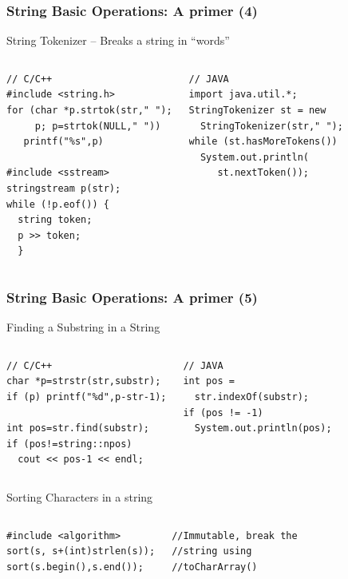 \documentclass{beamer}
\begin{document}
\begin{frame}[fragile]
  \frametitle{String Basic Operations: A primer (4)}
  {\smaller
    \begin{block}{String Tokenizer -- Breaks a string in ``words''}
      \begin{columns}[T]
\begin{verbatim}
// C/C++
#include <string.h>
for (char *p.strtok(str," ");
     p; p=strtok(NULL," "))
   printf("%s",p)

#include <sstream>
stringstream p(str);
while (!p.eof()) {
  string token;
  p >> token;
  }
\end{verbatim}
\begin{verbatim}
// JAVA
import java.util.*;
StringTokenizer st = new
  StringTokenizer(str," ");
while (st.hasMoreTokens())
  System.out.println(
     st.nextToken());
\end{verbatim}
      \end{columns}
    \end{block}
    }
\end{frame}

\begin{frame}[fragile]
  \frametitle{String Basic Operations: A primer (5)}
  {\smaller
    \begin{block}{Finding a Substring in a String}
      \begin{columns}[T]
\begin{verbatim}
// C/C++
char *p=strstr(str,substr);
if (p) printf("%d",p-str-1);

int pos=str.find(substr);
if (pos!=string::npos)
  cout << pos-1 << endl;
\end{verbatim}
\begin{verbatim}
// JAVA
int pos = 
  str.indexOf(substr);
if (pos != -1)
  System.out.println(pos);
\end{verbatim}
      \end{columns}
    \end{block}
    \begin{block}{Sorting Characters in a string}
      \begin{columns}[T]
\begin{verbatim}
#include <algorithm>
sort(s, s+(int)strlen(s));
sort(s.begin(),s.end());
\end{verbatim}
\begin{verbatim}
//Immutable, break the 
//string using 
//toCharArray()
\end{verbatim}
      \end{columns}
    \end{block}
  }
\end{frame}
\end{document}
